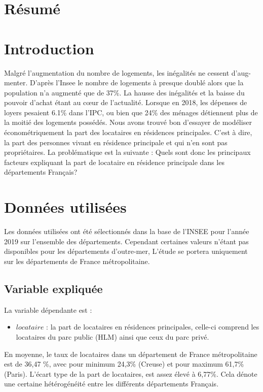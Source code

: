 \documentclass{article}
\begin{document}
\section{Résumé}
\section{Introduction} 
Malgré l'augmentation du nombre de logements, les inégalités ne cessent d'aug-menter. D'après l'Insee le nombre de logements à presque doublé alors que la population n'a augmenté que 
de 37\%\cite{evolution_hab}. La hausse des inégalités et la baisse du pouvoir d'achat étant au cœur de l'actualité. Lorsque en 2018, les dépenses de loyers pesaient 6.1\% dans l'IPC\cite{ipc_loyer}, ou bien que 24\% des ménages détiennent plus de la moitié des logements possédés\cite{part_appart}. Nous avons trouvé bon d'essayer de modéliser économétriquement la part des locataires en résidences principales. C'est à dire, la part des personnes vivant en résidence principale et qui n'en sont pas propriétaires. La problématique est la suivante :
Quels sont donc les principaux facteurs expliquant la part de locataire en résidence principale dans les départements Français? 

\section{Données utilisées}
Les données utilisées ont été sélectionnés dans la base de l'INSEE pour l'année 2019 sur l'ensemble des départements. Cependant certaines valeurs n'étant pas disponibles pour les départements d'outre-mer,
L'étude se portera uniquement sur les départements de France métropolitaine.
\subsection{Variable expliquée}
La variable dépendante est :
\begin{itemize}
    \item $locataire$ : la part de locataires en résidences principales, celle-ci comprend les locataires du parc public (HLM) ainsi que ceux du parc privé.
\end{itemize}
En moyenne, le taux de locataires dans un département de France métropolitaine est de 36,47 \%, avec pour minimum 24,3\% (Creuse) et pour maximum 61,7\%(Paris).
L'écart type de la part de locataires, est assez élevé à 6,77\%. Cela dénote une certaine hétérogénéité entre les différents départements Français.
\end{document}
